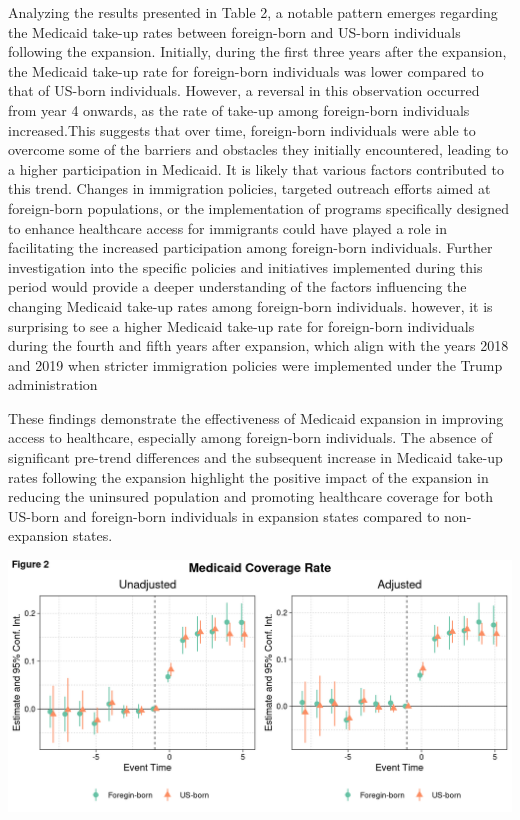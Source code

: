 \documentclass[
]{article}
\begin{document}
Analyzing the results presented in Table 2, a notable pattern emerges
regarding the Medicaid take-up rates between foreign-born and US-born
individuals following the expansion. Initially, during the first three
years after the expansion, the Medicaid take-up rate for foreign-born
individuals was lower compared to that of US-born individuals. However,
a reversal in this observation occurred from year 4 onwards, as the rate
of take-up among foreign-born individuals increased.This suggests that
over time, foreign-born individuals were able to overcome some of the
barriers and obstacles they initially encountered, leading to a higher
participation in Medicaid. It is likely that various factors contributed
to this trend. Changes in immigration policies, targeted outreach
efforts aimed at foreign-born populations, or the implementation of
programs specifically designed to enhance healthcare access for
immigrants could have played a role in facilitating the increased
participation among foreign-born individuals. Further investigation into
the specific policies and initiatives implemented during this period
would provide a deeper understanding of the factors influencing the
changing Medicaid take-up rates among foreign-born individuals. however,
it is surprising to see a higher Medicaid take-up rate for foreign-born
individuals during the fourth and fifth years after expansion, which
align with the years 2018 and 2019 when stricter immigration policies
were implemented under the Trump administration

These findings demonstrate the effectiveness of Medicaid expansion in
improving access to healthcare, especially among foreign-born
individuals. The absence of significant pre-trend differences and the
subsequent increase in Medicaid take-up rates following the expansion
highlight the positive impact of the expansion in reducing the uninsured
population and promoting healthcare coverage for both US-born and
foreign-born individuals in expansion states compared to non-expansion
states.

\begin{center}\includegraphics{figures/prefix-fig2-1} \end{center}
\end{document}
